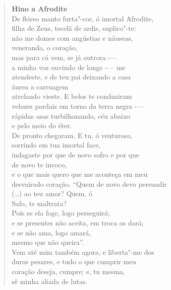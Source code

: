 \documentclass[12pt]{extarticle}
\begin{document}
\begin{enumerate}
\begin{verse}
\textbf{Hino a Afrodite}\\
De flóreo manto furta"-cor, ó imortal Afrodite,\\
filha de Zeus, tecelã de ardis, suplico"-te:\\
não me domes com angústias e náuseas,\\
veneranda, o coração,\\
\medskip
mas para cá vem, se já outrora -—\\
a minha voz ouvindo de longe -— me \\
atendeste, e de teu pai deixando a casa\\
áurea a carruagem\\
\medskip
atrelando vieste. E belos te conduziram\\
velozes pardais em torno da terra negra -—\\
rápidas asas turbilhonando, céu abaixo\\
e pelo meio do éter.\\
\medskip
De pronto chegaram. E tu, ó venturosa,\\
sorrindo em tua imortal face,\\
indagaste por que de novo sofro e por que\\
de novo te invoco,\\
\medskip
e o que mais quero que me aconteça em meu \\
desvairado coração. ``Quem de novo devo persuadir\\
({}\ldots{}) ao teu amor? Quem, ó\\
Safo, te maltrata?\\
\medskip
Pois se ela foge, logo perseguirá;\\
e se presentes não aceita, em troca os dará;\\
e se não ama, logo amará,\\
mesmo que não queira''.\\
\medskip
Vem até mim também agora, e liberta"-me dos\\
duros pesares, e tudo o que cumprir meu\\
coração deseja, cumpre; e, tu mesma,\\
sê minha aliada de lutas.\\
\end{verse}



\end{enumerate}
\end{document}
